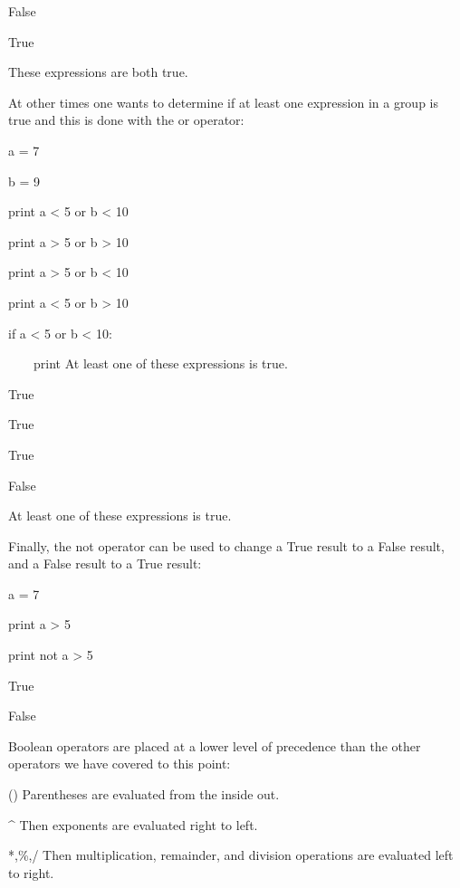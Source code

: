 \documentclass[12pt,twoside]{book}
\begin{document}
False

True

These expressions are both true.


\bigskip

At other times one wants to determine if at least one expression in a
group is true and this is done with the or operator:


\bigskip

a = 7

b = 9

print a {\textless} 5 or b {\textless} 10

print a {\textgreater} 5 or b {\textgreater} 10

print a {\textgreater} 5 or b {\textless} 10

print a {\textless} 5 or b {\textgreater} 10


\bigskip

if a {\textless} 5 or b {\textless} 10:

\ \ \ \ print {\textquotedbl}At least one of these expressions is
true.{\textquotedbl}

{\textbar}

True

True

True

False

At least one of these expressions is true.

Finally, the not operator can be used to change a True result to a False
result, and a False result to a True result:


\bigskip

a = 7

print a {\textgreater} 5

print not a {\textgreater} 5

{\textbar}

True

False

Boolean operators are placed at a lower level of precedence than the
other operators we have covered to this point:


\bigskip

() Parentheses are evaluated from the inside out.


\bigskip

\^{} Then exponents are evaluated right to left.


\bigskip

*,\%,/ Then multiplication, remainder, and division operations are
evaluated left to right.
\end{document}
